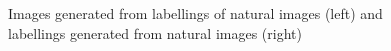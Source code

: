 \begin{figure}
\centering

\caption{Images generated from labellings of natural images (left) and labellings generated from natural images (right)}
\label{fig:mrl_teaser}
\end{figure}









